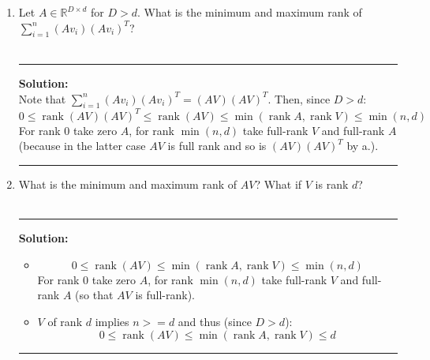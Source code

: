 \documentclass{article}
\newcommand{\1}{\mathbf{1}}
\DeclareMathOperator{\rank}{rank}
\begin{document}
\begin{enumerate}
            \noindent\rule{\textwidth}{1pt}
        \item Let $A \in \mathbb{R}^{D \times d}$ for $D > d$. What is the minimum and maximum rank of $\sum_{i=1}^n (A v_i) (A v_i)^T$?
        \\
        \\
            \noindent\rule{\textwidth}{1pt}
            {\bf Solution:}\\
            Note that $\sum_{i=1}^n (A v_i) (A v_i)^T = (AV)(AV)^T$. Then, since $D>d$:
            $$
            \boxed{ 0 \le \rank(AV)(AV)^T \le \rank(AV) \le \min(\rank A, \rank V) \le \min(n,d)}
            $$
            For rank 0 take zero $A$, for rank $\min(n,d)$ take full-rank $V$ and full-rank $A$ (because in the latter case $AV$ is full rank and so is $(AV)(AV)^T$ by a.).
        
            \noindent\rule{\textwidth}{1pt}
        \item What is the minimum and maximum rank of $AV$? What if $V$ is rank $d$?
        \\
        \\
            \noindent\rule{\textwidth}{1pt}
            {\bf Solution:}\\
            \begin{itemize}
            \item
            $$
            \boxed{ 0 \le \rank(AV) \le \min(\rank A, \rank V) \le \min(n,d)}
            $$
            For rank 0 take zero $A$, for rank $\min(n,d)$ take full-rank $V$ and full-rank $A$ (so that $AV$ is full-rank).
            \item $V$ of rank $d$ implies $n>=d$ and thus (since $D>d$):
            $$
            \boxed{ 0 \le \rank(AV) \le \min(\rank A, \rank V) \le d}
            $$
            \end{itemize}
        
            \noindent\rule{\textwidth}{1pt}
    \end{enumerate}
\end{document}
